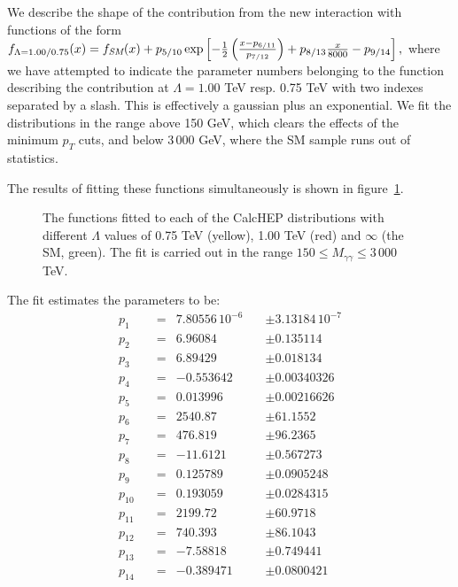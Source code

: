 We describe the shape of the contribution from the new interaction with functions of the form
\(f_{\Lambda=1.00/0.75}(x)=f_\textit{SM}(x)+p_{5/10}\exp\left[-\frac{1}{2}\left(\frac{x-p_{6/11}}{p_{7/12}}\right)+p_{8/13}\frac{x}{8000}-p_{9/14}\right],\)
where we have attempted to indicate the parameter numbers belonging to the function describing the contribution at $\Lambda=1.00$ TeV resp. 0.75 TeV with two indexes separated by a slash. This is effectively a gaussian plus an exponential. We fit the distributions in the range above 150 GeV, which clears the effects of the minimum $p_T$ cuts, and below 3\,000 GeV, where the SM sample runs out of statistics.

The results of fitting these functions simultaneously is shown in figure~\ref{simfit}.


\begin{figure}[hbt]
\begin{infilsf}\tiny

\end{infilsf}
\caption{The functions fitted to each of the CalcHEP distributions with different $\Lambda$ values of 0.75 TeV (yellow), 1.00 TeV (red) and $\infty$ (the SM, green). The fit is carried out in the range $150 \le M_{\gamma\gamma} \le 3\,000$ TeV.}\label{simfit}
\end{figure}

The fit estimates the parameters to be:\allowdisplaybreaks
\begin{align*}
p_1                      & \quad = &  7.80556\,10^{-6}   \quad & \pm    3.13184\,10^{-7} \\
p_2                      & \quad = &      6.96084   \quad & \pm    0.135114    \\
p_3                      & \quad = &      6.89429   \quad & \pm    0.018134    \\
p_4                      & \quad = &    -0.553642   \quad & \pm    0.00340326  \\
p_5                      & \quad = &     0.013996   \quad & \pm    0.00216626  \\
p_6                      & \quad = &      2540.87   \quad & \pm    61.1552     \\
p_7                      & \quad = &      476.819   \quad & \pm    96.2365     \\
p_8                      & \quad = &     -11.6121   \quad & \pm    0.567273    \\
p_9                      & \quad = &     0.125789   \quad & \pm    0.0905248   \\
p_{10}                     & \quad = &     0.193059   \quad & \pm    0.0284315   \\
p_{11}                     & \quad = &      2199.72   \quad & \pm    60.9718     \\
p_{12}                     & \quad = &      740.393   \quad & \pm    86.1043     \\
p_{13}                     & \quad = &     -7.58818   \quad & \pm    0.749441    \\
p_{14}                     & \quad = &    -0.389471   \quad & \pm    0.0800421   
\end{align*}

